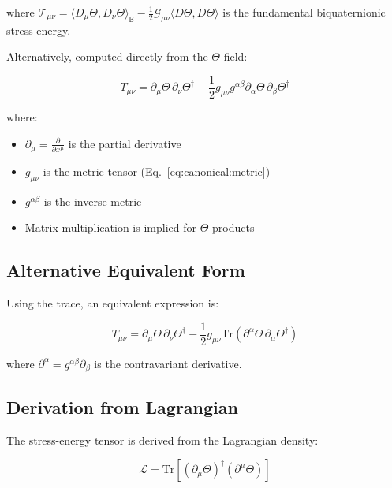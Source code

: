 where $\mathcal{T}_{\mu\nu} = \langle D_\mu \Theta, D_\nu \Theta \rangle_\mathbb{B} - \frac{1}{2}\mathcal{G}_{\mu\nu}\langle D\Theta, D\Theta \rangle$ is the fundamental biquaternionic stress-energy.

Alternatively, computed directly from the $\Theta$ field:

\begin{equation}
\label{eq:canonical:stress_energy_from_theta}
T_{\mu\nu} = \partial_\mu\Theta \, \partial_\nu\Theta^\dagger - \frac{1}{2} g_{\mu\nu} g^{\alpha\beta} \partial_\alpha\Theta \, \partial_\beta\Theta^\dagger
\end{equation}

\noindent where:
\begin{itemize}
    \item $\partial_\mu = \frac{\partial}{\partial x^\mu}$ is the partial derivative
    \item $g_{\mu\nu}$ is the metric tensor (Eq.~\ref{eq:canonical:metric})
    \item $g^{\alpha\beta}$ is the inverse metric
    \item Matrix multiplication is implied for $\Theta$ products
\end{itemize}

\subsection{Alternative Equivalent Form}

Using the trace, an equivalent expression is:

\begin{equation}
\label{eq:canonical:stress_energy_alt}
T_{\mu\nu} = \partial_\mu\Theta \, \partial_\nu\Theta^\dagger - \frac{1}{2} g_{\mu\nu} \text{Tr}\left(\partial^\alpha\Theta \, \partial_\alpha\Theta^\dagger\right)
\end{equation}

where $\partial^\alpha = g^{\alpha\beta}\partial_\beta$ is the contravariant derivative.

\subsection{Derivation from Lagrangian}

The stress-energy tensor is derived from the Lagrangian density:

\begin{equation}
\label{eq:canonical:lagrangian_theta}
\mathcal{L} = \text{Tr}\left[(\partial_\mu\Theta)^\dagger (\partial^\mu\Theta)\right]
\end{equation}

